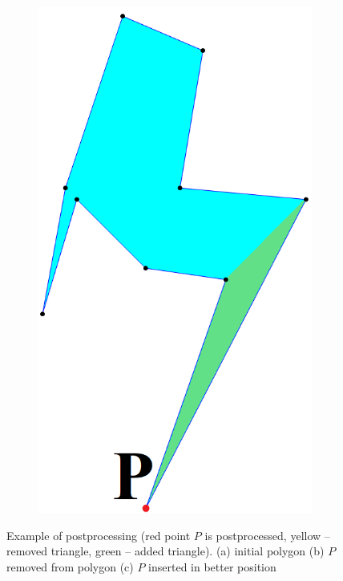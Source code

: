 \documentclass[conference]{IEEEtran}
\begin{document}
\begin{figure}[htbp]
\begin{subfigure}{0.32\linewidth}
					\includegraphics[width=0.99\textwidth]{fig2c.png}
					\caption{}
					\label{fig2c}
				\end{subfigure}
				
				\caption
				{
					Example of postprocessing (red point $P$ is postprocessed, yellow -- removed triangle, green -- added triangle).
					(a) initial polygon
					(b) $P$ removed from polygon
					(c) $P$ inserted in better position
				}
				\label{fig2}
			\end{figure}
	
\end{document}
